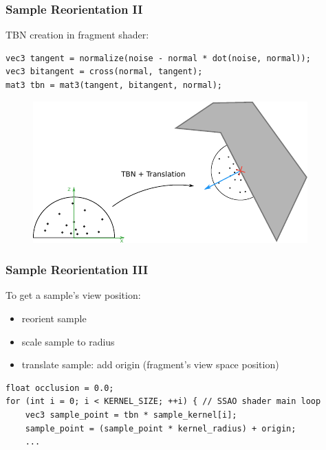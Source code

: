 \documentclass{beamer}
\newcommand{\redtext}[1]{\textcolor{myred}{#1}}
\begin{document}
\begin{frame}[fragile]
\frametitle{Sample Reorientation II}

TBN creation in fragment shader:
\begin{verbatim}
vec3 tangent = normalize(noise - normal * dot(noise, normal));
vec3 bitangent = cross(normal, tangent);
mat3 tbn = mat3(tangent, bitangent, normal);
\end{verbatim}

\vspace{-0.2cm}
\begin{figure}
    \centering
    \includegraphics[width=0.7\linewidth]{images/kernel_reorientation.pdf}
\end{figure}

\end{frame}

\begin{frame}[fragile]
\frametitle{Sample Reorientation III}
To get a sample's view position:
\begin{itemize}
    \item \redtext{reorient} sample
    \item \redtext{scale} sample to radius
    \item \redtext{translate} sample: add origin (fragment's view space position)
\end{itemize}
\begin{verbatim}
float occlusion = 0.0;
for (int i = 0; i < KERNEL_SIZE; ++i) { // SSAO shader main loop
    vec3 sample_point = tbn * sample_kernel[i];
    sample_point = (sample_point * kernel_radius) + origin;
    ...
\end{verbatim}

\end{frame}
\end{document}
